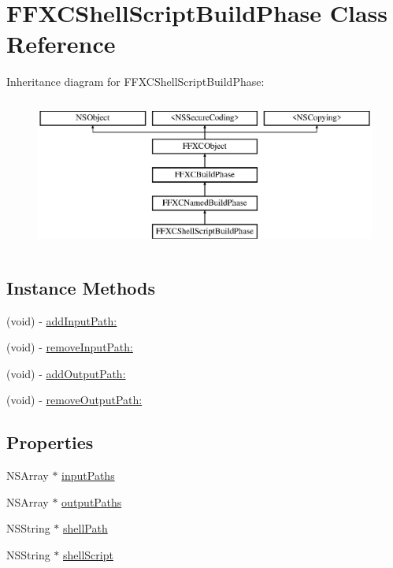 \hypertarget{interface_f_f_x_c_shell_script_build_phase}{\section{F\-F\-X\-C\-Shell\-Script\-Build\-Phase Class Reference}
\label{interface_f_f_x_c_shell_script_build_phase}
}
Inheritance diagram for F\-F\-X\-C\-Shell\-Script\-Build\-Phase\-:\begin{figure}[H]
\begin{center}
\leavevmode
\includegraphics[height=5.000000cm]{interface_f_f_x_c_shell_script_build_phase}
\end{center}
\end{figure}
\subsection*{Instance Methods}
\begin{DoxyCompactItemize}
\item 
(void) -\/ \hyperlink{interface_f_f_x_c_shell_script_build_phase_a0848de3624765e3930c55841ef062eab}{add\-Input\-Path\-:}
\item 
(void) -\/ \hyperlink{interface_f_f_x_c_shell_script_build_phase_ae426273f10e23456d8a38403bae781db}{remove\-Input\-Path\-:}
\item 
(void) -\/ \hyperlink{interface_f_f_x_c_shell_script_build_phase_a626f9283fe4715817df202318e800a4f}{add\-Output\-Path\-:}
\item 
(void) -\/ \hyperlink{interface_f_f_x_c_shell_script_build_phase_a1bed9b557cefb031978aa361fccb9c21}{remove\-Output\-Path\-:}
\end{DoxyCompactItemize}
\subsection*{Properties}
\begin{DoxyCompactItemize}
\item 
N\-S\-Array $\ast$ \hyperlink{interface_f_f_x_c_shell_script_build_phase_ad781d48348c3eac6e5e68aaded4d714f}{input\-Paths}
\item 
N\-S\-Array $\ast$ \hyperlink{interface_f_f_x_c_shell_script_build_phase_a55d07f36a782c0d42d290bd91d271839}{output\-Paths}
\item 
N\-S\-String $\ast$ \hyperlink{interface_f_f_x_c_shell_script_build_phase_ad51964bbebad3c7f267ad3b74d2cca38}{shell\-Path}
\item 
N\-S\-String $\ast$ \hyperlink{interface_f_f_x_c_shell_script_build_phase_aa297d31181345a1cc3c37a51a9297db7}{shell\-Script}
\end{DoxyCompactItemize}


